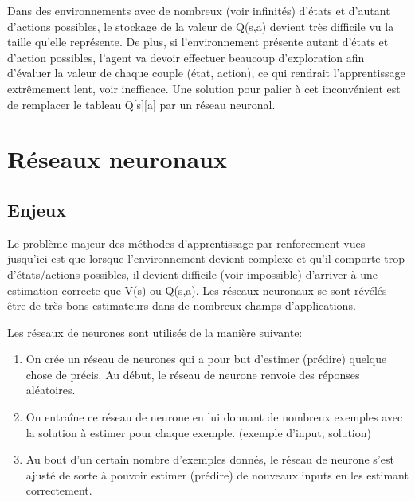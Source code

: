 \documentclass[11pt,a4paper]{report}
\begin{document}
   \par Dans des environnements avec de nombreux (voir infinités) d'états et d'autant d'actions possibles, le stockage de la valeur de Q(s,a) devient très difficile vu la taille qu'elle représente. De plus, si l'environnement présente autant d'états et d'action possibles, l'agent va devoir effectuer beaucoup d'exploration afin d'évaluer la valeur de chaque couple (état, action), ce qui rendrait l'apprentissage extrêmement lent, voir inefficace. Une solution pour palier à cet inconvénient est de remplacer le tableau Q[s][a] par un réseau neuronal. 
   
  \section{Réseaux neuronaux}
  
  \subsection{Enjeux}
  
      \par Le problème majeur des méthodes d'apprentissage par renforcement vues jusqu'ici est que lorsque l'environnement devient complexe et qu'il comporte trop d'états/actions possibles, il devient difficile (voir impossible) d'arriver à une estimation correcte que V(s) ou Q(s,a). Les réseaux neuronaux se sont révélés être de très bons estimateurs dans de nombreux champs d'applications. 
      
      \par Les réseaux de neurones sont utilisés de la manière suivante:
      
      \begin{enumerate}
      \item On crée un réseau de neurones qui a pour but d'estimer (prédire) quelque chose de précis. Au début, le réseau de neurone renvoie des réponses aléatoires. 
      \item On entraîne ce réseau de neurone en lui donnant de nombreux exemples avec la solution à estimer pour chaque exemple. (exemple d'input, solution)
      \item Au bout d'un certain nombre d'exemples donnés, le réseau de neurone s'est ajusté de sorte à pouvoir estimer (prédire) de nouveaux inputs en les estimant correctement. 
      \end{enumerate}  
      
\end{document}
